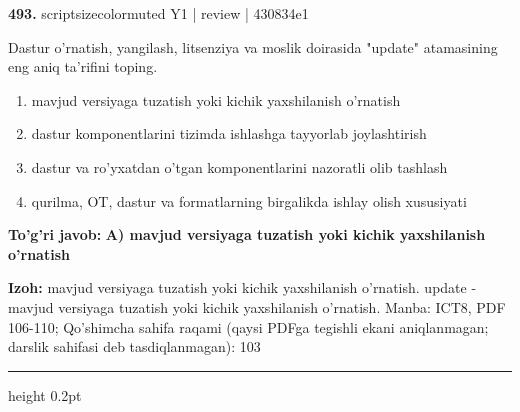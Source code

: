 \documentclass[10pt,a4paper]{article}
\begin{document}
{\bfseries\sffamily\color{ink} 493.} {scriptsizecolor{muted} Y1 | review | 430834e1}
\par
Dastur o'rnatish, yangilash, litsenziya va moslik doirasida "update" atamasining eng aniq ta'rifini toping.
\begin{enumerate}[label=\Alph*),leftmargin=9mm]
\item mavjud versiyaga tuzatish yoki kichik yaxshilanish o'rnatish
\item dastur komponentlarini tizimda ishlashga tayyorlab joylashtirish
\item dastur va ro'yxatdan o'tgan komponentlarini nazoratli olib tashlash
\item qurilma, OT, dastur va formatlarning birgalikda ishlay olish xususiyati
\end{enumerate}
\begin{tcolorbox}[enhanced,breakable,colback=teal!4,colframe=teal!60!black,boxrule=0.45pt,arc=1.2mm,left=2.7mm,right=2.7mm,top=1.8mm,bottom=1.8mm,before skip=2mm,after skip=2mm]
{\bfseries\sffamily\color{teal}To'g'ri javob:} \textbf{A) mavjud versiyaga tuzatish yoki kichik yaxshilanish o'rnatish}
\par\smallskip
{\bfseries Izoh:} mavjud versiyaga tuzatish yoki kichik yaxshilanish o'rnatish. update - mavjud versiyaga tuzatish yoki kichik yaxshilanish o'rnatish. Manba: ICT8, PDF 106-110; Qo'shimcha sahifa raqami (qaysi PDFga tegishli ekani aniqlanmagan; darslik sahifasi deb tasdiqlanmagan): 103
\end{tcolorbox}
\vspace{2mm}\hrule height 0.2pt\vspace{3mm}
\end{document}

